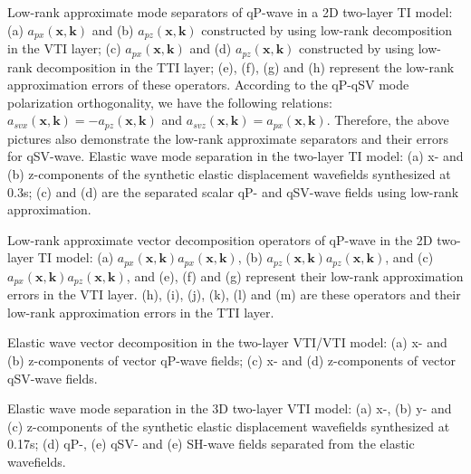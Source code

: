 {
Low-rank approximate mode separators of qP-wave in a 2D two-layer TI model:
(a) $a_{px}(\mathbf{x},\mathbf{k})$ and (b) $a_{pz}(\mathbf{x},\mathbf{k})$ constructed by using low-rank decomposition in the VTI layer;
(c) $a_{px}(\mathbf{x},\mathbf{k})$ and (d) $a_{pz}(\mathbf{x},\mathbf{k})$ constructed by using low-rank decomposition in the TTI layer;
(e), (f), (g) and (h) represent the low-rank approximation errors of these operators.
According to the qP-qSV mode polarization orthogonality, we have the following relations:
$a_{svx}(\mathbf{x},\mathbf{k})=-a_{pz}(\mathbf{x},\mathbf{k})$ and
$a_{svz}(\mathbf{x},\mathbf{k})=a_{px}(\mathbf{x},\mathbf{k})$. Therefore, the above pictures also
demonstrate the low-rank approximate separators and their errors for qSV-wave.
}
{
Elastic wave mode separation in the two-layer TI model:
(a) x- and (b) z-components of the synthetic elastic displacement wavefields synthesized at 0.3s;
(c) and (d) are the separated scalar qP- and qSV-wave fields using low-rank approximation.
}

{
Low-rank approximate vector decomposition operators of qP-wave in the 2D two-layer TI model:
(a) $a_{px}(\mathbf{x},\mathbf{k})a_{px}(\mathbf{x},\mathbf{k})$,
	(b) $a_{pz}(\mathbf{x},\mathbf{k})a_{pz}(\mathbf{x},\mathbf{k})$,
	and (c) $a_{px}(\mathbf{x},\mathbf{k})a_{pz}(\mathbf{x},\mathbf{k})$,
	and (e), (f) and (g) represent their low-rank approximation errors in the VTI layer.
(h), (i), (j), (k), (l) and (m) are these operators and their low-rank approximation errors in the TTI layer.
}

{
Elastic wave vector decomposition in the two-layer VTI/VTI model:
(a) x- and (b) z-components of vector qP-wave fields;
(c) x- and (d) z-components of vector qSV-wave fields.
}

{
Elastic wave mode separation in the 3D two-layer VTI model:
(a) x-, (b) y- and (c) z-components of the synthetic elastic displacement wavefields synthesized at 0.17s;
(d) qP-, (e) qSV- and (e) SH-wave fields separated from the elastic wavefields.
}

